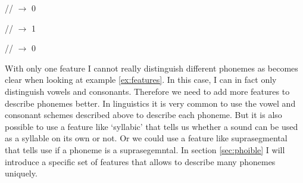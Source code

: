 \begin{covsubexamples}[preamble={The examples show how we can describe different phonemes using features. `1' stands for: `is-a-consonant'. `0' stands for: `is-not-a-consonant' (which means that it is a vowel).}]
\label{ex:features}
\item \label{ex:features1} // $\rightarrow$ 0
\item \label{ex:features2} // $\rightarrow$ 1
\item \label{ex:features3} // $\rightarrow$ 0
\end{covsubexamples}

With only one feature I cannot really distinguish different phonemes as becomes clear when looking at example \ref{ex:features}. In this case, I can in fact only distinguish vowels and consonants. Therefore we need to add more features to describe phonemes better. In linguistics it is very common to use the vowel and consonant schemes described above to describe each phoneme. But it is also possible to use a feature like `syllabic' that tells us whether a sound can be used as a syllable on its own or not. Or we could use a feature like suprasegmental that tells use if a phoneme is a suprasegemntal. In section \ref{sec:phoible}  I will introduce a specific set of features that allows to describe many phonemes uniquely. 
  



